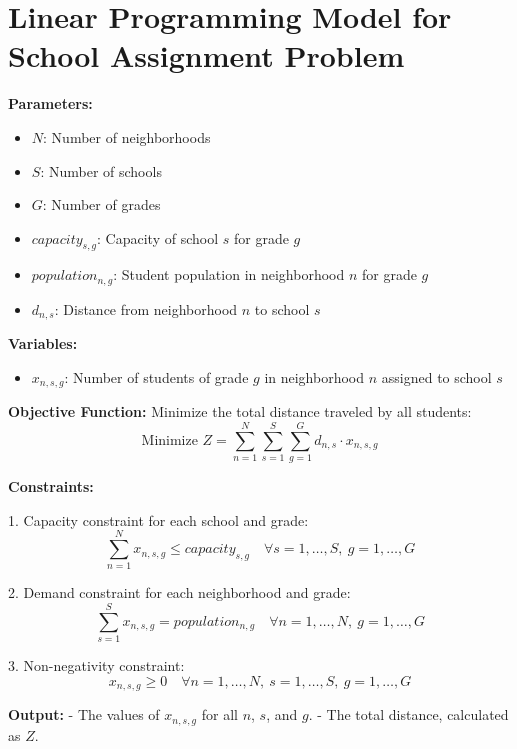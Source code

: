 \documentclass{article}
\begin{document}
\section*{Linear Programming Model for School Assignment Problem}

\textbf{Parameters:}
\begin{itemize}
    \item $N$: Number of neighborhoods
    \item $S$: Number of schools
    \item $G$: Number of grades
    \item $capacity_{s,g}$: Capacity of school $s$ for grade $g$
    \item $population_{n,g}$: Student population in neighborhood $n$ for grade $g$
    \item $d_{n,s}$: Distance from neighborhood $n$ to school $s$
\end{itemize}

\textbf{Variables:}
\begin{itemize}
    \item $x_{n,s,g}$: Number of students of grade $g$ in neighborhood $n$ assigned to school $s$
\end{itemize}

\textbf{Objective Function:}
Minimize the total distance traveled by all students:
\[
\text{Minimize } Z = \sum_{n=1}^{N} \sum_{s=1}^{S} \sum_{g=1}^{G} d_{n,s} \cdot x_{n,s,g}
\]

\textbf{Constraints:}

1. Capacity constraint for each school and grade:
\[
\sum_{n=1}^{N} x_{n,s,g} \leq capacity_{s,g} \quad \forall s=1,\ldots,S, \ g=1,\ldots,G
\]

2. Demand constraint for each neighborhood and grade:
\[
\sum_{s=1}^{S} x_{n,s,g} = population_{n,g} \quad \forall n=1,\ldots,N, \ g=1,\ldots,G
\]

3. Non-negativity constraint:
\[
x_{n,s,g} \geq 0 \quad \forall n=1,\ldots,N, \ s=1,\ldots,S, \ g=1,\ldots,G
\]

\textbf{Output:}
- The values of $x_{n,s,g}$ for all $n$, $s$, and $g$.
- The total distance, calculated as $Z$.
\end{document}
